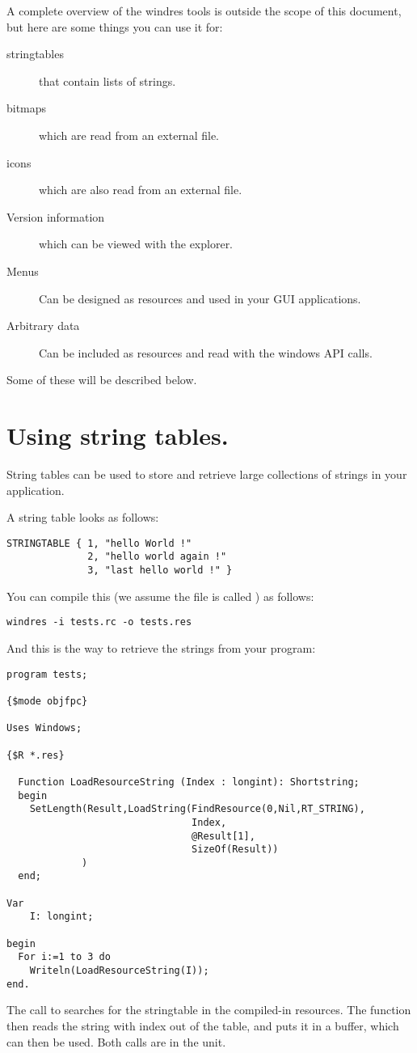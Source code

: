 A complete overview of the windres tools is outside the scope of this
document, but here are some things you can use it for:
\begin{description}
\item[stringtables] that contain lists of strings.
\item[bitmaps] which are read from an external file.
\item[icons] which are also read from an external file.
\item[Version information] which can be viewed with the \windows
explorer.
\item[Menus] Can be designed as resources and used in your GUI
applications.
\item[Arbitrary data] Can be included as resources and read with the
windows API calls.
\end{description}

Some of these will be described below.
\section{Using string tables.}
String tables can be used to store and retrieve large collections of
strings in your application.

A string table looks as follows:
\begin{verbatim}
STRINGTABLE { 1, "hello World !"
              2, "hello world again !"
              3, "last hello world !" }
\end{verbatim}
You can compile this (we assume the file is called ) as
follows:
\begin{verbatim}
windres -i tests.rc -o tests.res
\end{verbatim}
And this is the way to retrieve the strings from your program:
\begin{verbatim}
program tests;

{$mode objfpc}

Uses Windows;

{$R *.res}

  Function LoadResourceString (Index : longint): Shortstring;
  begin
    SetLength(Result,LoadString(FindResource(0,Nil,RT_STRING),
                                Index,
                                @Result[1],
                                SizeOf(Result))
             )
  end;

Var
    I: longint;

begin
  For i:=1 to 3 do
    Writeln(LoadResourceString(I));
end.
\end{verbatim}
The call to  searches for the stringtable in the
compiled-in resources. The  function then reads the
string with index  out of the table, and puts it in a buffer,
which can then be used. Both calls are in the  unit.

